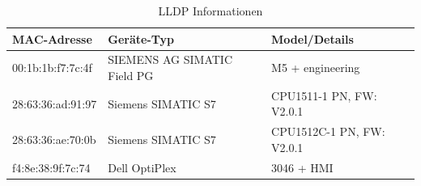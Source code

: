 \documentclass[
    a4paper,
    pagesize,
	pdftex,
    12pt,
]{scrartcl}
\begin{document}

\begin{table}[H]
    \centering
    \begin{tabular}{|l|l|l|}
    \hline
    \textbf{MAC-Adresse} & \textbf{Geräte-Typ} & \textbf{Model/Details} \\
    \hline
    00:1b:1b:f7:7c:4f & SIEMENS AG SIMATIC Field PG & M5 + engineering \\
    28:63:36:ad:91:97 & Siemens SIMATIC S7 & CPU1511-1 PN, FW: V2.0.1 \\
    28:63:36:ae:70:0b & Siemens SIMATIC S7 & CPU1512C-1 PN, FW: V2.0.1 \\
    f4:8e:38:9f:7c:74 & Dell OptiPlex & 3046 + HMI \\
    \hline
    \end{tabular}
    \caption{LLDP Informationen}
    \label{tab:ws-lldp-info}
\end{table}
\end{document}
